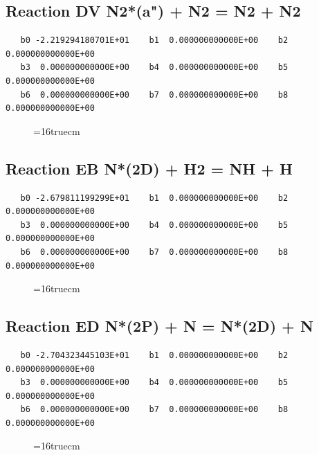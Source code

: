 \documentclass[12pt,dvipdfm]{article}
\begin{document}
\subsection{
Reaction DV N2*(a") + N2 = N2 + N2}
\begin{small}\begin{verbatim}
   b0 -2.219294180701E+01    b1  0.000000000000E+00    b2  0.000000000000E+00
   b3  0.000000000000E+00    b4  0.000000000000E+00    b5  0.000000000000E+00
   b6  0.000000000000E+00    b7  0.000000000000E+00    b8  0.000000000000E+00
   \end{verbatim}\end{small}
\begin{figure}[h!]
\label{n2rates}
\epsfxsize=16truecm
\end{figure}
\newpage

\subsection{
Reaction EB N*(2D) + H2 = NH + H}
\begin{small}\begin{verbatim}
   b0 -2.679811199299E+01    b1  0.000000000000E+00    b2  0.000000000000E+00
   b3  0.000000000000E+00    b4  0.000000000000E+00    b5  0.000000000000E+00
   b6  0.000000000000E+00    b7  0.000000000000E+00    b8  0.000000000000E+00
   \end{verbatim}\end{small}
\begin{figure}[h!]
\label{n2rates}
\epsfxsize=16truecm
\end{figure}
\newpage

\subsection{
Reaction ED N*(2P) + N = N*(2D) + N}
\begin{small}\begin{verbatim}
   b0 -2.704323445103E+01    b1  0.000000000000E+00    b2  0.000000000000E+00
   b3  0.000000000000E+00    b4  0.000000000000E+00    b5  0.000000000000E+00
   b6  0.000000000000E+00    b7  0.000000000000E+00    b8  0.000000000000E+00
   \end{verbatim}\end{small}
\begin{figure}[h!]
\label{n2rates}
\epsfxsize=16truecm
\end{figure}
\newpage
\end{document}
